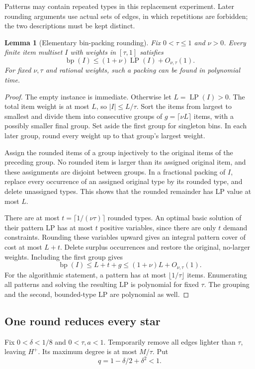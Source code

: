 \documentclass[11pt]{article}
\newtheorem{lemma}[theorem]{Lemma}
\theoremstyle{definition}\newtheorem{algorithm}{Algorithm}[section]
\numberwithin{equation}{section}
\theoremstyle{remark}\newtheorem*{remark}{Remark}
\begin{document}
Patterns may contain repeated types in this replacement experiment.
Later rounding arguments use actual sets of edges, in which repetitions
are forbidden; the two descriptions must be kept distinct.

\begin{lemma}[Elementary bin-packing rounding]\label{lem:bin-rounding}
Fix $0<\tau\le1$ and $\nu>0$. Every finite item multiset $I$ with
weights in $[\tau,1]$ satisfies
\[
 \operatorname{bp}(I)\le(1+\nu)\operatorname{LP}(I)+O_{\nu,\tau}(1).
\]
For fixed $\nu,\tau$ and rational weights, such a packing can be found
in polynomial time.
\end{lemma}
\begin{proof}
The empty instance is immediate. Otherwise let
$L=\operatorname{LP}(I)>0$. The total item weight is at most $L$, so
$|I|\le L/\tau$. Sort the items from largest to smallest and divide
them into consecutive groups of $g=\lceil\nu L\rceil$ items, with a
possibly smaller final group. Set aside the first group for singleton
bins. In each later group, round every weight up to that group's largest
weight.

Assign the rounded items of a group injectively to the original items
of the preceding group. No rounded item is larger than its assigned
original item, and these assignments are disjoint between groups.
In a fractional packing of $I$, replace every occurrence of an assigned
original type by its rounded type, and delete unassigned types. This
shows that the rounded remainder has LP value at most $L$.

There are at most $t=\lceil1/(\nu\tau)\rceil$ rounded types.
An optimal basic solution of their pattern LP has at most $t$ positive
variables, since there are only $t$ demand constraints. Rounding these
variables upward gives an integral pattern cover of cost at most $L+t$.
Delete surplus occurrences and restore the original, no-larger weights.
Including the first group gives
\[
 \operatorname{bp}(I)\le L+t+g\le(1+\nu)L+O_{\nu,\tau}(1).
\]
For the algorithmic statement, a pattern has at most
$\lfloor1/\tau\rfloor$ items. Enumerating all patterns and solving the
resulting LP is polynomial for fixed $\tau$. The grouping and the
second, bounded-type LP are polynomial as well.
\end{proof}

\subsection{One round reduces every star}
Fix $0<\delta<1/8$ and $0<\tau,a<1$. Temporarily remove all edges
lighter than $\tau$, leaving $H^+$. Its maximum degree is at most
$M/\tau$. Put
\[
 q=1-\delta/2+\delta^2<1.
\]
\end{document}
